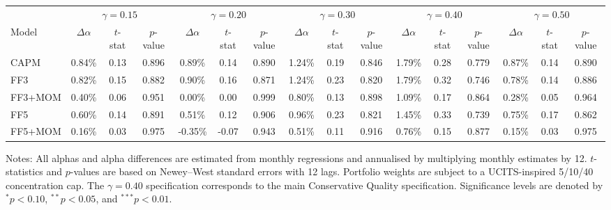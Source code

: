 \begin{table}[H]
\begin{threeparttable}
\begin{tabular*}{\textwidth}{@{\extracolsep{\fill}}lccccccccccccccc}
\toprule
 & \multicolumn{3}{c}{$\gamma=0.15$} & \multicolumn{3}{c}{$\gamma=0.20$} & \multicolumn{3}{c}{$\gamma=0.30$} & \multicolumn{3}{c}{$\gamma=0.40$} & \multicolumn{3}{c}{$\gamma=0.50$} \\
\cmidrule(lr){2-4} \cmidrule(lr){5-7} \cmidrule(lr){8-10} \cmidrule(lr){11-13} \cmidrule(lr){14-16}
Model & $\Delta\alpha$ & $t$-stat & $p$-value & $\Delta\alpha$ & $t$-stat & $p$-value & $\Delta\alpha$ & $t$-stat & $p$-value & $\Delta\alpha$ & $t$-stat & $p$-value & $\Delta\alpha$ & $t$-stat & $p$-value \\
\midrule
CAPM      & 0.84\% & 0.13 & 0.896 & 0.89\% & 0.14 & 0.890 & 1.24\% & 0.19 & 0.846 & 1.79\% & 0.28 & 0.779 & 0.87\% & 0.14 & 0.890 \\
FF3       & 0.82\% & 0.15 & 0.882 & 0.90\% & 0.16 & 0.871 & 1.24\% & 0.23 & 0.820 & 1.79\% & 0.32 & 0.746 & 0.78\% & 0.14 & 0.886 \\
FF3+MOM   & 0.40\% & 0.06 & 0.951 & 0.00\% & 0.00 & 0.999 & 0.80\% & 0.13 & 0.898 & 1.09\% & 0.17 & 0.864 & 0.28\% & 0.05 & 0.964 \\
FF5       & 0.60\% & 0.14 & 0.891 & 0.51\% & 0.12 & 0.906 & 0.96\% & 0.23 & 0.821 & 1.45\% & 0.33 & 0.739 & 0.75\% & 0.17 & 0.862 \\
FF5+MOM   & 0.16\% & 0.03 & 0.975 & -0.35\% & -0.07 & 0.943 & 0.51\% & 0.11 & 0.916 & 0.76\% & 0.15 & 0.877 & 0.15\% & 0.03 & 0.975 \\
\bottomrule
\end{tabular*}
\begin{tablenotes}[flushleft]
\footnotesize
\item Notes: All alphas and alpha differences are estimated from monthly regressions and annualised by multiplying monthly estimates by 12. $t$-statistics and $p$-values are based on Newey--West standard errors with 12 lags. Portfolio weights are subject to a UCITS-inspired 5/10/40 concentration cap. The $\gamma=0.40$ specification corresponds to the main Conservative Quality specification. Significance levels are denoted by $^{*} p<0.10$, $^{**} p<0.05$, and $^{***} p<0.01$.
\end{tablenotes}
\end{threeparttable}
\end{table}
